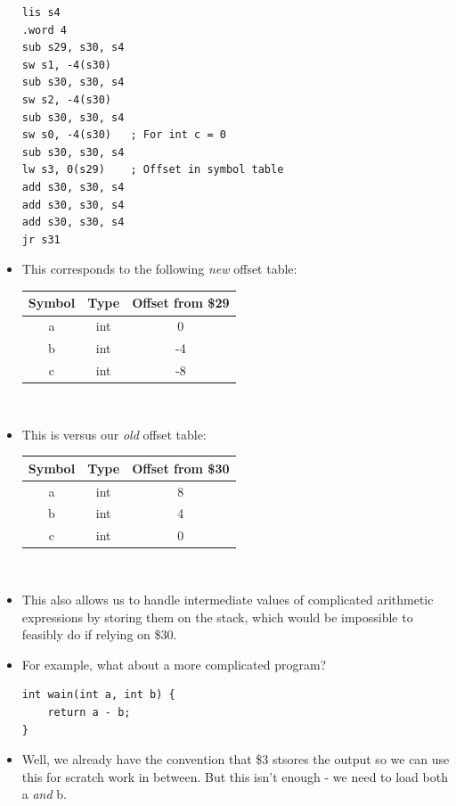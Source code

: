 \documentclass[12pt]{article}
\begin{document}
\begin{itemize}
\begin{lstlisting}[mathescape, numbers=none, breaklines=true]
lis s4
.word 4
sub s29, s30, s4
sw s1, -4(s30)
sub s30, s30, s4
sw s2, -4(s30)
sub s30, s30, s4
sw s0, -4(s30)   ; For int c = 0
sub s30, s30, s4
lw s3, 0(s29)    ; Offset in symbol table
add s30, s30, s4
add s30, s30, s4
add s30, s30, s4
jr s31
\end{lstlisting}
    \item This corresponds to the following \emph{new} offset table:\\
        \begin{center}
        \begin{tabular}{|c|c|c|}
            \hline
            Symbol & Type & Offset from \$29 \\
            \hline
            a & int & 0 \\
            b & int & -4 \\
            c & int & -8 \\
            \hline
        \end{tabular}\\
        \end{center}
    \item This is versus our \emph{old} offset table:\\
        \begin{center}
        \begin{tabular}{|c|c|c|}
            \hline
            Symbol & Type & Offset from \$30 \\
            \hline
            a & int & 8 \\
            b & int & 4 \\
            c & int & 0 \\
            \hline
        \end{tabular}\\
        \end{center}
    \item This also allows us to handle intermediate values of complicated arithmetic expressions by storing them on the stack, which would be impossible to feasibly do if relying on \$30.
    \item For example, what about a more complicated program?
\begin{lstlisting}[mathescape, numbers=none, breaklines=true]
int wain(int a, int b) {
    return a - b;
}
\end{lstlisting}
    \item Well, we already have the convention that \$3 stsores the output so we can use this for scratch work in between.  But this isn't enough - we need to load both a \emph{and} b.

\end{itemize}
\end{document}
